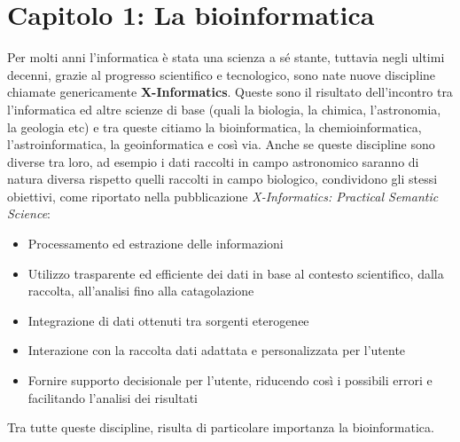 \chapter{Capitolo 1: La bioinformatica}
Per molti anni l'informatica è stata una scienza a sé stante, tuttavia negli ultimi decenni, grazie al progresso scientifico e tecnologico, sono nate nuove discipline chiamate genericamente \textbf{X-Informatics}. Queste sono il risultato dell'incontro tra l'informatica ed altre scienze di base (quali la biologia, la chimica, l'astronomia, la geologia etc) e tra queste citiamo la bioinformatica, la chemioinformatica, l'astroinformatica, la geoinformatica e così via.
Anche se queste discipline sono diverse tra loro, ad esempio i dati raccolti in campo astronomico saranno di natura diversa rispetto quelli raccolti in campo biologico, condividono gli stessi obiettivi, come riportato nella pubblicazione \cite{xinformatics} \textit{X-Informatics: Practical Semantic Science}:
\begin{itemize}
	\item Processamento ed estrazione delle informazioni
	\item Utilizzo trasparente ed efficiente dei dati in base al contesto scientifico, dalla raccolta, all'analisi fino alla catagolazione
	\item Integrazione di dati ottenuti tra sorgenti eterogenee
	\item Interazione con la raccolta dati adattata e personalizzata per l'utente
	\item Fornire supporto decisionale per l'utente, riducendo così i possibili errori e facilitando l'analisi dei risultati
\end{itemize}
Tra tutte queste discipline, risulta di particolare importanza la bioinformatica.
